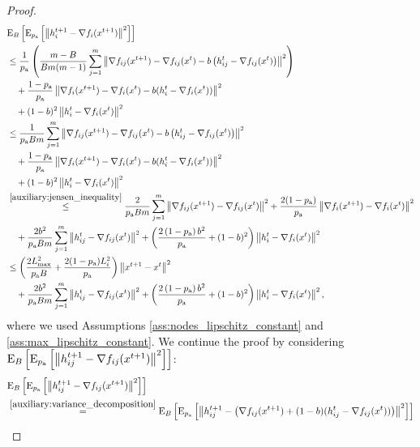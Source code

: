 \documentclass{article}
\newcommand*{\probavailable}{\ensuremath{p_{\textnormal{a}}}}
\begin{document}
\begin{proof}
  \begin{align*}
    &\ExpSub{B}{\ExpSub{\probavailable}{\norm{h^{t+1}_i - \nabla f_i(x^{t+1})}^2}} \\
    &\leq\frac{1}{\probavailable} \left(\frac{m - B}{B m (m - 1)}\sum_{j=1}^m\norm{\nabla f_{ij}(x^{t+1}) - \nabla f_{ij}(x^{t}) - b \left(h^t_{ij} - \nabla f_{ij}(x^{t})\right)}^2\right) \\
    &\quad +\frac{1 - \probavailable}{\probavailable} \norm{\nabla f_i(x^{t+1}) - \nabla f_i(x^{t}) - b(h^t_i - \nabla f_i(x^{t}))}^2 \\
    &\quad +(1 - b)^2\norm{h^{t}_i - \nabla f_i(x^{t})}^2 \\
    &\leq\frac{1}{\probavailable B m} \sum_{j=1}^m\norm{\nabla f_{ij}(x^{t+1}) - \nabla f_{ij}(x^{t}) - b \left(h^t_{ij} - \nabla f_{ij}(x^{t})\right)}^2 \\
    &\quad +\frac{1 - \probavailable}{\probavailable} \norm{\nabla f_i(x^{t+1}) - \nabla f_i(x^{t}) - b(h^t_i - \nabla f_i(x^{t}))}^2 \\
    &\quad +(1 - b)^2\norm{h^{t}_i - \nabla f_i(x^{t})}^2 \\
    &\overset{\eqref{auxiliary:jensen_inequality}}{\leq}\frac{2}{\probavailable B m} \sum_{j=1}^m\norm{\nabla f_{ij}(x^{t+1}) - \nabla f_{ij}(x^{t})}^2 +\frac{2(1 - \probavailable)}{\probavailable} \norm{\nabla f_i(x^{t+1}) - \nabla f_i(x^{t})}^2 \\
    &\quad + \frac{2 b^2}{\probavailable B m} \sum_{j=1}^m\norm{h^t_{ij} - \nabla f_{ij}(x^{t})}^2 +\left(\frac{2 \left(1 - \probavailable\right) b^2}{\probavailable} + (1 - b)^2\right)\norm{h^{t}_i - \nabla f_i(x^{t})}^2 \\
    &\leq\left(\frac{2 L_{\max}^2}{\probavailable B} +\frac{2(1 - \probavailable) L_i^2}{\probavailable}\right) \norm{x^{t+1} - x^{t}}^2 \\
    &\quad + \frac{2 b^2}{\probavailable B m} \sum_{j=1}^m\norm{h^t_{ij} - \nabla f_{ij}(x^{t})}^2 +\left(\frac{2 \left(1 - \probavailable\right) b^2}{\probavailable} + (1 - b)^2\right)\norm{h^{t}_i - \nabla f_i(x^{t})}^2,
  \end{align*}
  where we used Assumptions \ref{ass:nodes_lipschitz_constant} and \ref{ass:max_lipschitz_constant}. We continue the proof by considering $\ExpSub{B}{\ExpSub{\probavailable}{\norm{h^{t+1}_{ij} - \nabla f_{ij}(x^{t+1})}^2}}$:
  \begin{align*}
    &\ExpSub{B}{\ExpSub{\probavailable}{\norm{h^{t+1}_{ij} - \nabla f_{ij}(x^{t+1})}^2}} \\
    &\overset{\eqref{auxiliary:variance_decomposition}}{=}\ExpSub{B}{\ExpSub{\probavailable}{\norm{h^{t+1}_{ij} - \left(\nabla f_{ij}(x^{t+1}) + (1 - b)(h^t_{ij} - \nabla f_{ij}(x^{t}))\right)}^2}} \\

\end{align*}
\end{proof}
\end{document}
